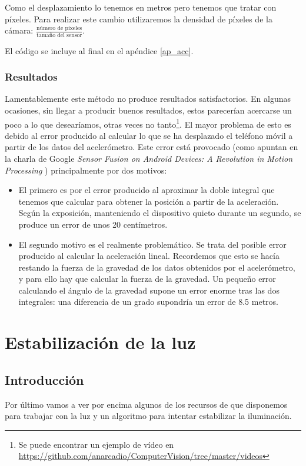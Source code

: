 \documentclass[a4paper,openright, 12pt]{book}
\begin{document}
Como el desplazamiento lo tenemos en metros pero tenemos que tratar con píxeles. Para realizar este cambio utilizaremos la densidad de píxeles de la cámara: $\frac{ \text{número de píxeles}}{\text{tamaño del sensor}}$.


El código se incluye al final en el apéndice \ref{ap_acc}.
\newpage


\subsection{Resultados}
Lamentablemente este método no produce resultados satisfactorios. En algunas ocasiones, sin llegar a producir buenos resultados, estos parecerían acercarse un poco a lo que desearíamos, otras veces no tanto\footnote{Se puede encontrar un ejemplo de vídeo en \url{https://github.com/anarcadio/ComputerVision/tree/master/videos}}. El mayor problema de esto es debido al error producido al calcular lo que se ha desplazado el teléfono móvil a partir de los datos del acelerómetro.
Este error está provocado  (como apuntan en la charla de Google \textit{Sensor Fusion on Android Devices: A Revolution in Motion Processing} \cite{googlesensor}) principalmente por dos motivos:
\begin{itemize}
\item El primero es por el error producido al aproximar la doble integral que tenemos que calcular para obtener la posición a partir de la aceleración. Según la exposición, manteniendo el dispositivo quieto durante un segundo, se produce un error de unos 20 centímetros.
\item El segundo motivo es el realmente problemático. Se trata del posible error producido al calcular la aceleración lineal. Recordemos que esto se hacía restando la fuerza de la gravedad de los datos obtenidos por el acelerómetro, y para ello hay que calcular la fuerza de la gravedad. Un pequeño error calculando el ángulo de la gravedad supone un error enorme tras las dos integrales: una diferencia de un grado supondría un error de 8.5 metros.
\end{itemize}

\chapter{Estabilización de la luz} \label{cap.luz}
\section{Introducción}
Por último vamos a ver por encima algunos de los recursos de que disponemos para trabajar con la luz y un algoritmo para intentar estabilizar la iluminación.
\end{document}
